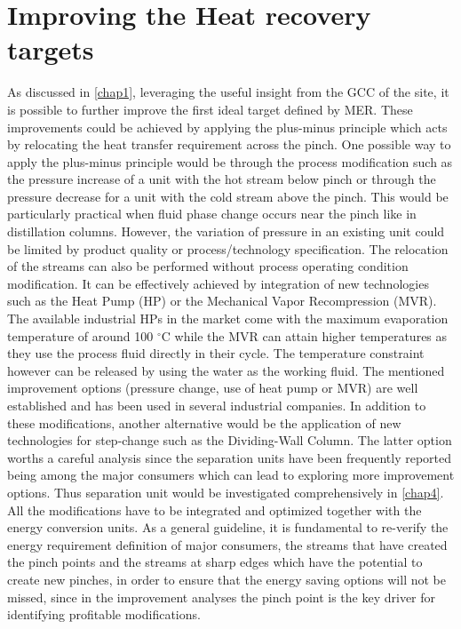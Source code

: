 \section{Improving the Heat recovery targets}
\label{sec:TSIheatrecovery}
As discussed in \cref{chap1}, leveraging the useful insight from the GCC of the site, it is possible to further improve the first ideal target defined by MER. These improvements could be achieved by applying the plus-minus principle \cite{umeda1979thermodynamic,linnhoff1984heat} which acts by relocating the heat transfer requirement across the pinch. One possible way to apply the plus-minus principle would be through the process modification such as the pressure increase of a unit with the hot stream below pinch or through the pressure decrease for a unit with the cold stream above the pinch. This would be particularly practical when fluid phase change occurs near the pinch like in distillation columns. However, the variation of pressure in an existing unit could be limited by product quality or process/technology specification. The relocation of the streams can also be performed without process operating condition modification. It can be effectively achieved by integration of new technologies such as the Heat Pump (HP) or the Mechanical Vapor Recompression (MVR). The available industrial HPs in the market come with the maximum evaporation temperature of around 100 $^{\circ}\mathrm{C}$ while the MVR can attain higher temperatures as they use the process fluid directly in their cycle. The temperature constraint however can be released by using the water as the working fluid. The mentioned improvement options (pressure change, use of heat pump or MVR) are well established and has been used in several industrial companies. In addition to these modifications, another alternative would be the application of new technologies for step-change such as the Dividing-Wall Column. The latter option worths a careful analysis since the separation units have been frequently reported being among the major consumers which can lead to exploring more improvement options. Thus separation unit would be investigated comprehensively in \cref{chap4}. All the modifications have to be integrated and optimized together with the energy conversion units.
As a general guideline, it is fundamental to re-verify the energy requirement definition of major consumers, the streams that have created the pinch points and the streams at sharp edges which have the potential to create new pinches, in order to ensure that the energy saving options will not be missed, since in the improvement analyses the pinch point is the key driver for identifying profitable modifications.



